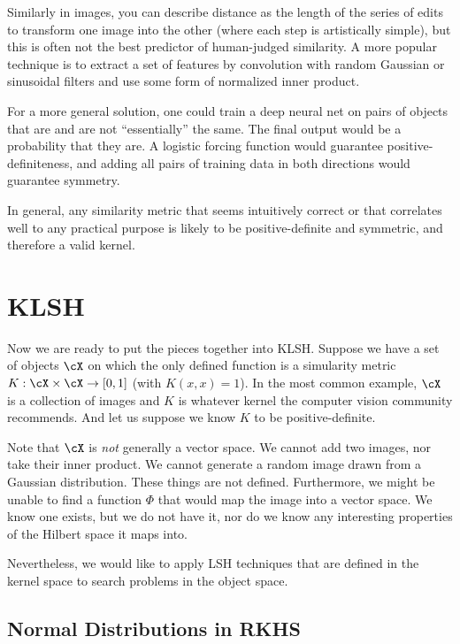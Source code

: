 \documentclass[twoside,11pt]{homework}
\begin{document}
\begin{multicols}{2}
Similarly in images, you can describe distance as the length of the
series of edits to transform one image into the other (where each step
is artistically simple), but this is often not the best predictor of
human-judged similarity.  A more popular technique is to extract a set
of features by convolution with random Gaussian or sinusoidal filters
and use some form of normalized inner product.

For a more general solution, one could train a deep neural net on
pairs of objects that are and are not ``essentially'' the same.  The
final output would be a probability that they are.  A logistic forcing
function would guarantee positive-definiteness, and adding all pairs
of training data in both directions would guarantee symmetry.

In general, any similarity metric that seems intuitively correct or
that correlates well to any practical purpose is likely to be
positive-definite and symmetric, and therefore a valid kernel.

\section{KLSH}

Now we are ready to put the pieces together into KLSH.  Suppose we
have a set of objects $\cX$ on which the only defined function is a
simularity metric $K:\cX \times \cX \rightarrow [0,1]$ (with
$K(x,x)=1$).  In the most
common example, $\cX$ is a collection of images and $K$ is whatever kernel the computer
vision community recommends.  And let us suppose we know $K$ to be
positive-definite.

Note that $\cX$ is \emph{not} generally a vector space.  We cannot add two
images, nor take their inner product.  We cannot generate a random
image drawn from a Gaussian distribution.  These things are not
defined.  Furthermore, we might be unable to find a function $\Phi$ that would map
the image into a vector space.  We know one exists, but we do not have
it, nor do we know any interesting properties of the Hilbert space it
maps into.

Nevertheless, we would like to apply LSH techniques that are defined
in the kernel space to search problems in the object space.
  
\subsection{Normal Distributions in RKHS} %


\end{multicols}
\end{document}
